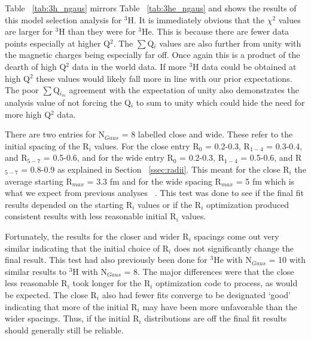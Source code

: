 Table ~\ref{tab:3h_ngaus} mirrors Table ~\ref{tab:3he_ngaus} and shows the results of this model selection analysis for $^3$H. It is immediately obvious that the $\chi^2$ values are larger for $^3$H than they were for $^3$He. This is because there are fewer data points especially at higher Q$^2$. The $\sum$Q$_i$ values are also further from unity with the magnetic charges being especially far off. Once again this is a product of the dearth of high Q$^2$ data in the world data. If more $^3$H data could be obtained at high Q$^2$ these values would likely fall more in line with our prior expectations. The poor $\sum$Q$_{i_{m}}$ agreement with the expectation of unity also demonstrates the analysis value of not forcing the Q$_i$ to sum to unity which could hide the need for more high Q$^2$ data.

There are two entries for N$_{Gaus}$ = 8 labelled close and wide. These refer to the initial spacing of the R$_i$ values. For the close entry R$_0$ = 0.2-0.3, R$_{1-4}$ = 0.3-0.4, and R$_{5-7}$ = 0.5-0.6, and for the wide entry R$_0$ = 0.2-0.3, R$_{1-4}$ = 0.5-0.6, and R$_{5-7}$ = 0.8-0.9 as explained in Section ~\ref{ssec:radii}. This meant for the close R$_i$ the average starting R$_{max}$ = 3.3 fm and for the wide spacing R$_{max}$ = 5 fm which is what we expect from previous analyses ~\cite{Article:Amroun}. This test was done to see if the final fit results depended on the starting R$_i$ values or if the R$_i$ optimization produced consistent results with less reasonable initial R$_i$ values.

Fortunately, the results for the closer and wider R$_i$ spacings come out very similar indicating that the initial choice of R$_i$ does not significantly change the final result. This test had also previously been done for $^3$He with N$_{Gaus}$ = 10 with similar results to $^3$H with N$_{Gaus}$ = 8. The major differences were that the close less reasonable R$_i$ took longer for the R$_i$ optimization code to process, as would be expected. The close R$_i$ also had fewer fits converge to be designated `good' indicating that more of the initial R$_i$ may have been more unfavorable than the wider spacings. Thus, if the initial R$_i$ distributions are off the final fit results should generally still be reliable.  

